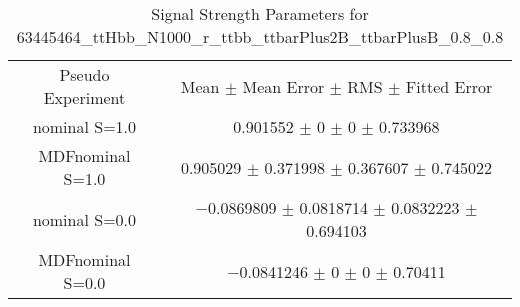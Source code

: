 \begin{table}
\centering
\caption{Signal Strength Parameters for 63445464\_ttHbb\_N1000\_r\_ttbb\_ttbarPlus2B\_ttbarPlusB\_0.8\_0.8}
\begin{tabular}{cc}
\toprule
Pseudo Experiment & Mean $\pm$ Mean Error $\pm$ RMS $\pm$ Fitted Error\\
nominal S=1.0 & \num{0.901552} $\pm$ \num{0} $\pm$ \num{0} $\pm$ \num{0.733968}\\
MDFnominal S=1.0 & \num{0.905029} $\pm$ \num{0.371998} $\pm$ \num{0.367607} $\pm$ \num{0.745022}\\
nominal S=0.0 & \num{-0.0869809} $\pm$ \num{0.0818714} $\pm$ \num{0.0832223} $\pm$ \num{0.694103}\\
MDFnominal S=0.0 & \num{-0.0841246} $\pm$ \num{0} $\pm$ \num{0} $\pm$ \num{0.70411}\\
\bottomrule
\end{tabular}
\end{table}